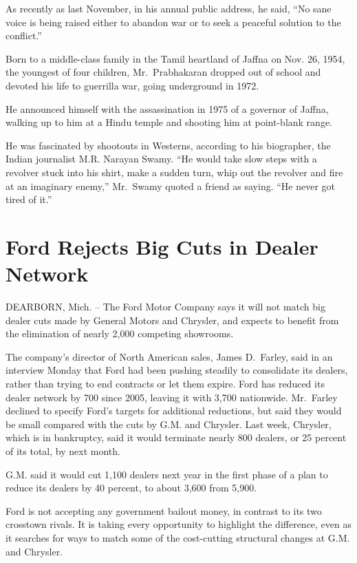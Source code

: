 \documentclass[12pt,a4paper,onecolumn]{article}
\begin{document}
As recently as last November, in his annual public address, he said, ``No sane voice is being raised
either to abandon war or to seek a peaceful solution to the conflict.''

Born to a middle-class family in the Tamil heartland of Jaffna on Nov. 26, 1954, the youngest of
four children, Mr.~Prabhakaran dropped out of school and devoted his life to guerrilla war, going
underground in 1972.

He announced himself with the assassination in 1975 of a governor of Jaffna, walking up to him at a
Hindu temple and shooting him at point-blank range.

He was fascinated by shootouts in Westerns, according to his biographer, the Indian journalist M.R.
Narayan Swamy. ``He would take slow steps with a revolver stuck into his shirt, make a sudden turn,
whip out the revolver and fire at an imaginary enemy,'' Mr.~Swamy quoted a friend as saying. ``He
never got tired of it.''

\section{Ford Rejects Big Cuts in Dealer Network}

DEARBORN, Mich. -- The Ford Motor Company says it will not match big dealer cuts made by General
Motors and Chrysler, and expects to benefit from the elimination of nearly 2,000 competing
showrooms.

The company's director of North American sales, James D.~Farley, said in an interview Monday that
Ford had been pushing steadily to consolidate its dealers, rather than trying to end contracts or
let them expire. Ford has reduced its dealer network by 700 since 2005, leaving it with 3,700
nationwide. Mr.~Farley declined to specify Ford's targets for additional reductions, but said they
would be small compared with the cuts by G.M. and Chrysler. Last week, Chrysler, which is in
bankruptcy, said it would terminate nearly 800 dealers, or 25 percent of its total, by next month.

G.M. said it would cut 1,100 dealers next year in the first phase of a plan to reduce its dealers by
40 percent, to about 3,600 from 5,900.

Ford is not accepting any government bailout money, in contrast to its two crosstown rivals. It is
taking every opportunity to highlight the difference, even as it searches for ways to match some of
the cost-cutting structural changes at G.M. and Chrysler.
\end{document}
